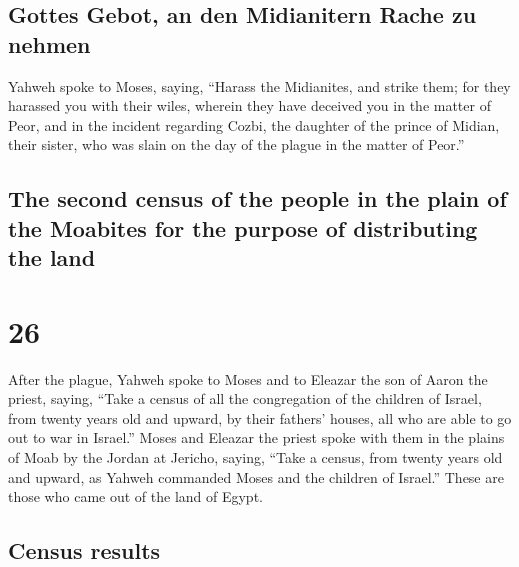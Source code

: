 \hypertarget{gottes-gebot-an-den-midianitern-rache-zu-nehmen}{%
\subsection{Gottes Gebot, an den Midianitern Rache zu
nehmen}\label{gottes-gebot-an-den-midianitern-rache-zu-nehmen}}

 Yahweh spoke to Moses, saying,  ``Harass
the Midianites, and strike them;  for they harassed you
with their wiles, wherein they have deceived you in the matter of Peor,
and in the incident regarding Cozbi, the daughter of the prince of
Midian, their sister, who was slain on the day of the plague in the
matter of Peor.''

\hypertarget{the-second-census-of-the-people-in-the-plain-of-the-moabites-for-the-purpose-of-distributing-the-land}{%
\subsection{The second census of the people in the plain of the Moabites
for the purpose of distributing the
land}\label{the-second-census-of-the-people-in-the-plain-of-the-moabites-for-the-purpose-of-distributing-the-land}}

\hypertarget{section-25}{%
\section{26}\label{section-25}}

 After the plague, Yahweh spoke to Moses and to Eleazar
the son of Aaron the priest, saying,  ``Take a census of
all the congregation of the children of Israel, from twenty years old
and upward, by their fathers' houses, all who are able to go out to war
in Israel.''  Moses and Eleazar the priest spoke with them
in the plains of Moab by the Jordan at Jericho, saying, 
``Take a census, from twenty years old and upward, as Yahweh commanded
Moses and the children of Israel.'' These are those who came out of the
land of Egypt.

\hypertarget{census-results-1}{%
\subsection{Census results}\label{census-results-1}}

